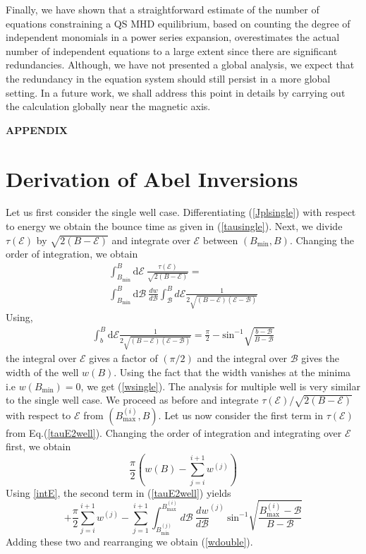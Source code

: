 \documentclass[aip,pop,reprint]{revtex4-1}
\newcommand*{\cB}{\mathcal{B}}
\newcommand*{\cE}{\mathcal{E}}
\newcommand*{\dt}{\mathrm{d}}
\newcommand*{\lbr}{\left(}
\newcommand*{\rbr}{\right)}
\newcommand*{\Bmin}{B_{\text{min}}}
\newcommand*{\Bmax}{B_{\text{max}}}
\begin{document}
 Finally, we have shown that a straightforward estimate of the number of equations constraining a QS MHD equilibrium, based on counting the degree of independent monomials in a power series expansion, overestimates the actual number of independent equations to a large extent since there are significant redundancies. Although, we have not presented a global analysis, we expect that the redundancy in the equation system should still persist in a more global setting. In a future work, we shall address this point in details by carrying out the calculation globally near the magnetic axis.  

 
 
 
 
 
\begin{appendices}
 \begin{center}
      {\bf APPENDIX}
    \end{center}
\renewcommand{\thefigure}{A-\arabic{figure}} %
\section{Derivation of Abel Inversions}\label{appendix 0}    
Let us first consider the single well case. Differentiating (\ref{Jplsingle}) with respect to energy we obtain the bounce time as given in (\ref{tausingle}). Next, we divide $\tau(\cE)$ by $ \sqrt{2(B-\cE)} $ and integrate over $\cE$ between $(\Bmin,B)$. Changing the order of integration, we obtain
 \begin{align}
 \int_{B_{\text{min}}}^B \dt\cE\: \frac{\tau(\cE)}{\sqrt{2(B-\cE)}} = \\ 
 \int_{B_{\text{min}}}^B \dt\cB\:\frac{dw}{d\cB}\int_{\cB}^B d\cE \frac{1}{2\sqrt{(B-\cE)(\cE-\cB)}} \nonumber
 \end{align}
Using,
\begin{align}
\int_{b}^B \dt\cE \frac{1}{2\sqrt{(B-\cE)(\cE-\cB)}} = \frac{\pi}{2} - \text{sin}^{-1}{\sqrt{\frac{b-\cB}{B-\cB}}}
\label{intE}
\end{align}
the integral over $\cE$ gives a factor of $(\pi/2)$ and the integral over $\cB$ gives the width of the well $w(B)$. Using the fact that the width vanishes at the minima i.e $w(\Bmin)=0$, we get (\ref{wsingle}).
 The analysis for multiple well is very similar to the single well case. We proceed as before and integrate $\tau(\cE)/\sqrt{2(B-\cE)}$ with respect to $\cE$ from $(\Bmax^{(i)},B)$. Let us now consider the first term in $\tau(\cE)$ from Eq.(\ref{tauE2well}). Changing the order of integration and integrating over $\cE$ first, we obtain
 $$\frac{\pi}{2}\lbr w(B)- \sum_{j=i}^{i+1} w^{(j)}\rbr$$ 
 Using \ref{intE}, the second term in (\ref{tauE2well}) yields
 $$+\frac{\pi}{2}\sum_{j=i}^{i+1} w^{(j)}-\sum_{j=1}^{i+1}\int_{\Bmin^{(j)}}^{\Bmax^{(i)}} d\cB\: \frac{dw}{d\cB}^{(j)}\:  \text{sin}^{-1}{\sqrt{\frac{\Bmax^{(i)}-\cB}{B-\cB}}}$$
 Adding these two and rearranging we obtain (\ref{wdouble}). 


\end{appendices}
\end{document}
